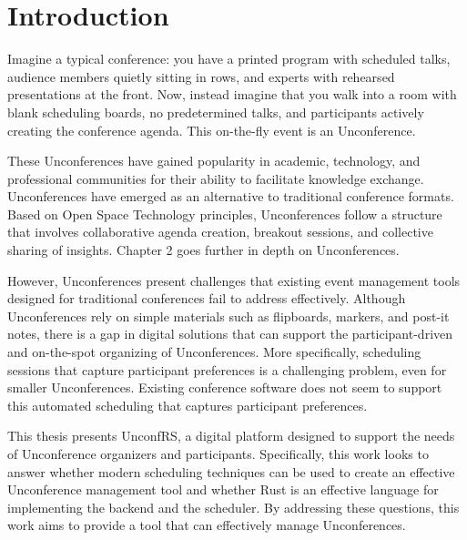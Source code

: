 \chapter{Introduction}
Imagine a typical conference: you have a printed program with scheduled talks, audience members quietly sitting in rows, and experts with rehearsed presentations at the front. Now, instead imagine that you walk into a room with blank scheduling boards, no predetermined talks, and participants actively creating the conference agenda. This on-the-fly event is an Unconference.

These Unconferences have gained popularity in academic, technology, and professional communities for their ability to facilitate knowledge exchange. Unconferences have emerged as an alternative to traditional conference formats. Based on Open Space Technology principles, Unconferences follow a structure that involves collaborative agenda creation, breakout sessions, and collective sharing of insights. Chapter 2 goes further in depth on Unconferences.

However, Unconferences present challenges that existing event management tools designed for traditional conferences fail to address effectively. Although Unconferences rely on simple materials such as flipboards, markers, and post-it notes, there is a gap in digital solutions that can support the participant-driven and on-the-spot organizing of Unconferences. More specifically, scheduling sessions that capture participant preferences is a challenging problem, even for smaller Unconferences. Existing conference software does not seem to support this automated scheduling that captures participant preferences.

This thesis presents UnconfRS, a digital platform designed to support the needs of Unconference organizers and participants. Specifically, this work looks to answer whether modern scheduling techniques can be used to create an effective Unconference management tool and whether Rust is an effective language for implementing the backend and the scheduler. By addressing these questions, this work aims to provide a tool that can effectively manage Unconferences.